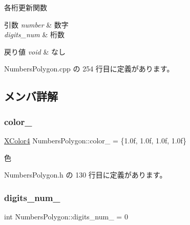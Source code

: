 各桁更新関数 


\begin{DoxyParams}{引数}
{\em number} & 数字 \\
\hline
{\em digits\+\_\+num} & 桁数 \\
\hline
\end{DoxyParams}

\begin{DoxyRetVals}{戻り値}
{\em void} & なし \\
\hline
\end{DoxyRetVals}


 Numbers\+Polygon.\+cpp の 254 行目に定義があります。



\subsection{メンバ詳解}
\mbox{\label{class_numbers_polygon_aa321020c1bfa1442d2dbbc78adf64481}} 
\subsubsection{\texorpdfstring{color\+\_\+}{color\_}}
{\footnotesize\ttfamily \mbox{\hyperlink{_vector3_d_8h_a680c30c4a07d86fe763c7e01169cd6cc}{X\+Color4}} Numbers\+Polygon\+::color\+\_\+ = \{1.\+0f, 1.\+0f, 1.\+0f, 1.\+0f\}\hspace{0.3cm}{\ttfamily [private]}}



色 



 Numbers\+Polygon.\+h の 130 行目に定義があります。

\mbox{\label{class_numbers_polygon_afd8a869c097a09810c939d8d0cc5449b}} 
\subsubsection{\texorpdfstring{digits\+\_\+num\+\_\+}{digits\_num\_}}
{\footnotesize\ttfamily int Numbers\+Polygon\+::digits\+\_\+num\+\_\+ = 0\hspace{0.3cm}{\ttfamily [private]}}



